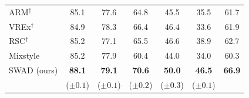 \begin{table}[t]
\begin{tabular}{lccccc|c}
ARM$^\dagger$~\cite{zhang2020arm}      & 85.1          & 77.6          & 64.8                & 45.5              & 35.5               & 61.7           \\
VREx$^\dagger$~\cite{krueger2020vrex}     & 84.9          & 78.3          & 66.4                & 46.4              & 33.6               & 61.9           \\
RSC$^\dagger$~\cite{huang2020rsc}      & 85.2          & 77.1          & 65.5                & 46.6              & 38.9               & 62.7           \\
Mixstyle~\cite{zhou2021mixstyle} & 85.2          & 77.9          & 60.4                & 44.0              & 34.0               & 60.3           \\ \midrule
SWAD (ours)    & \textbf{88.1} & \textbf{79.1}          & \textbf{70.6}       & \textbf{50.0}     & \textbf{46.5}      & \textbf{66.9} \\ \addlinespace[-0.15cm]
& \scriptsize{($\pm0.1$)} & \scriptsize{($\pm0.1$)} & \scriptsize{($\pm0.2$)} & \scriptsize{($\pm0.3$)} & \scriptsize{($\pm0.1$)} &\\
\bottomrule
\end{tabular}
\end{table}